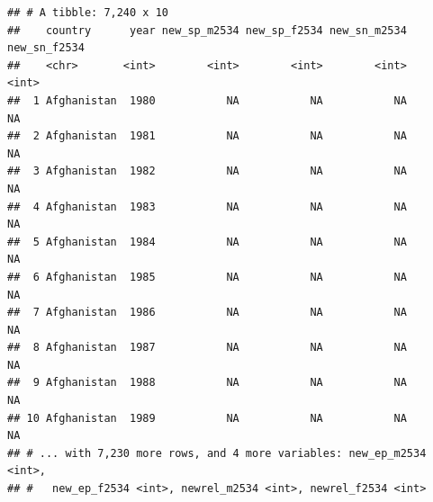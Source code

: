 \documentclass[]{article}
\newenvironment{Shaded}{\begin{snugshade}}{\end{snugshade}}
\newcommand{\CharTok}[1]{\textcolor[rgb]{0.31,0.60,0.02}{#1}}
\newcommand{\CommentTok}[1]{\textcolor[rgb]{0.56,0.35,0.01}{\textit{#1}}}
\newcommand{\KeywordTok}[1]{\textcolor[rgb]{0.13,0.29,0.53}{\textbf{#1}}}
\newcommand{\NormalTok}[1]{#1}
\newcommand{\OperatorTok}[1]{\textcolor[rgb]{0.81,0.36,0.00}{\textbf{#1}}}
\newcommand{\StringTok}[1]{\textcolor[rgb]{0.31,0.60,0.02}{#1}}
\begin{document}
\begin{Shaded}
\end{Shaded}

\begin{verbatim}
## # A tibble: 7,240 x 10
##    country      year new_sp_m2534 new_sp_f2534 new_sn_m2534 new_sn_f2534
##    <chr>       <int>        <int>        <int>        <int>        <int>
##  1 Afghanistan  1980           NA           NA           NA           NA
##  2 Afghanistan  1981           NA           NA           NA           NA
##  3 Afghanistan  1982           NA           NA           NA           NA
##  4 Afghanistan  1983           NA           NA           NA           NA
##  5 Afghanistan  1984           NA           NA           NA           NA
##  6 Afghanistan  1985           NA           NA           NA           NA
##  7 Afghanistan  1986           NA           NA           NA           NA
##  8 Afghanistan  1987           NA           NA           NA           NA
##  9 Afghanistan  1988           NA           NA           NA           NA
## 10 Afghanistan  1989           NA           NA           NA           NA
## # ... with 7,230 more rows, and 4 more variables: new_ep_m2534 <int>,
## #   new_ep_f2534 <int>, newrel_m2534 <int>, newrel_f2534 <int>
\end{verbatim}

\begin{Shaded}
\end{Shaded}
\end{document}
